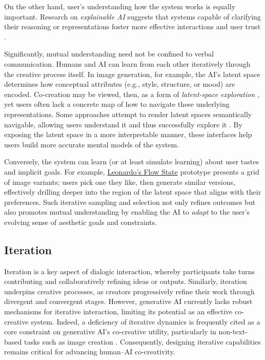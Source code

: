 On the other hand, user's understanding how the system works is equally important. Research on \textit{explainable AI} suggests that systems capable of clarifying their reasoning or representations foster more effective interactions and user trust \cite{Ribeiro2016-xb,Doshi-Velez2017-qv}.

Significantly, mutual understanding need not be confined to verbal communication. Humans and AI can learn from each other iteratively through the creative process itself. In image generation, for example, the AI's latent space determines how conceptual attributes (e.g., style, structure, or mood) are encoded. Co-creation may be viewed, then, as a form of \textit{latent-space exploration} \cite{Loh2024-fb,Smith2022-dm}, yet users often lack a concrete map of how to navigate these underlying representations. Some approaches attempt to render latent spaces semantically navigable, allowing users understand it and thus successfully explore it \cite{Prathyush2024-ly, Harkonen2020-eu, Davis2024-ml}. By exposing the latent space in a more interpretable manner, these interfaces help users build more accurate mental models of the system.

Conversely, the system can learn (or at least simulate learning) about user tastes and implicit goals. For example, \href{app.leonardo.ai/}{Leonardo's Flow State} prototype presents a grid of image variants; users pick one they like, then generate similar versions, effectively drilling deeper into the region of the latent space that aligns with their preferences. Such iterative sampling and selection not only refines outcomes but also promotes mutual understanding by enabling the AI to \textit{adapt} to the user's evolving sense of aesthetic goals and constraints.

\subsection{Iteration}

Iteration is a key aspect of dialogic interaction, whereby participants take turns contributing and collaboratively refining ideas or outputs. Similarly, iteration underpins creative processes, as creators progressively refine their work through divergent and convergent stages. However, generative AI currently lacks robust mechanisms for iterative interaction, limiting its potential as an effective co-creative system. Indeed, a deficiency of iterative dynamics is frequently cited as a core constraint on generative AI's co-creative utility, particularly in non-text-based tasks such as image creation \cite{Park2024-gw, Ocampo2023-gu, Peng2024-tr}. Consequently, designing iterative capabilities remains critical for advancing human–AI co-creativity.

